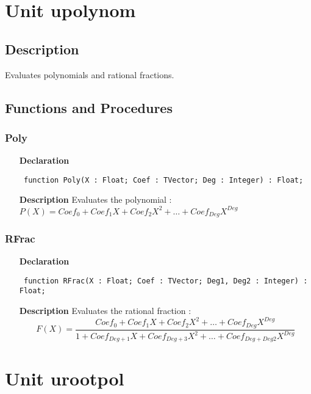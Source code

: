\documentclass[12pt,a4paper,oneside]{report}
\newcommand{\declarationitem}[1]{\textbf{#1}}
\newcommand{\descriptiontitle}[1]{\textbf{#1}}
\newcommand{\code}[1]{\texttt{#1}}
\begin{document}
\section{Unit upolynom}
\label{upolynom}
\subsection{Description}
Evaluates polynomials and rational fractions. 
\subsection{Functions and Procedures}
\subsubsection{Poly}
\label{upolynom-Poly}
\begin{itemize}\item[\declarationitem{Declaration}\hfill]
	\begin{flushleft}
		\code{
			function Poly(X : Float; Coef : TVector; Deg : Integer) : Float;}
		
	\end{flushleft}
	
	\par
	\item[\descriptiontitle{Description}]
	Evaluates the polynomial : $P(X) = Coef_0 + Coef_1 X + Coef_2 X^2 + \dots + Coef_{Deg} X^{Deg}$
\end{itemize}
\subsubsection{RFrac}
\label{upolynom-RFrac}
\begin{itemize}\item[\declarationitem{Declaration}\hfill]
	\begin{flushleft}
		\code{
			function RFrac(X : Float; Coef : TVector; Deg1, Deg2 : Integer) : Float;}
		
	\end{flushleft}
	
	\par
	\item[\descriptiontitle{Description}]
	Evaluates the rational fraction :
	$$F(X) = \frac{ Coef_0 + Coef_1 X + Coef_2 X^2 + \dots + Coef_{Deg} X^{Deg}}{ 1 + Coef_{Deg+1} X + Coef_{Deg+3} X^2 + \dots + Coef_{Deg+Deg2} X^{Deg}}$$
\end{itemize}
\section{Unit urootpol}
\label{urootpol}
\end{document}

